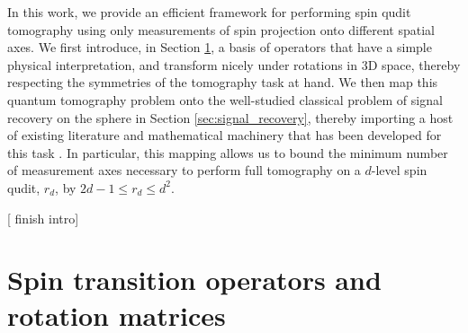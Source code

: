 \documentclass[notitlepage,twocolumn]{revtex4-2}
\newcommand{\1}{\mathds{1}}
\newcommand{\red}[1]{{\color{red} #1}}
\begin{document}
In this work, we provide an efficient framework for performing spin qudit tomography using only measurements of spin projection onto different spatial axes.
We first introduce, in Section \ref{sec:transition_ops}, a basis of operators that have a simple physical interpretation, and transform nicely under rotations in 3D space, thereby respecting the symmetries of the tomography task at hand.
We then map this quantum tomography problem onto the well-studied classical problem of signal recovery on the sphere in Section \ref{sec:signal_recovery}, thereby importing a host of existing literature and mathematical machinery that has been developed for this task \cite{mcewen2011novel, mcewen2011sampling, rauhut2011sparse, alem2012sparse, khalid2014optimaldimensionality}.
In particular, this mapping allows us to bound the minimum number of measurement axes necessary to perform full tomography on a $d$-level spin qudit, $r_d$, by $2d-1\le r_d\le d^2$.

[\red{finish intro}]

\section{Spin transition operators and rotation matrices}
\label{sec:transition_ops}
\end{document}
